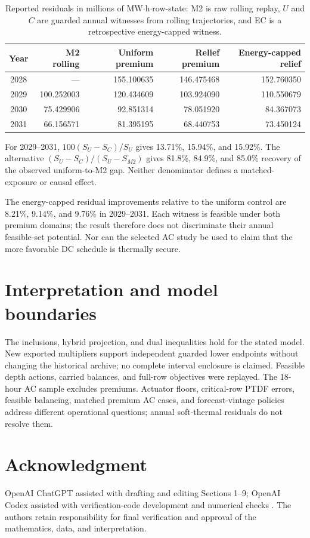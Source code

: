 \documentclass[11pt]{article}
\begin{document}
\begin{table}[ht]
\centering\small
\caption{Reported residuals in millions of MW$\cdot$h$\cdot$row-state: M2 is raw rolling replay, $U$ and $C$ are guarded annual witnesses from rolling trajectories, and EC is a retrospective energy-capped witness.}
\begin{tabular}{@{}crrrr@{}}\toprule
Year & M2 rolling & Uniform premium & Relief premium & Energy-capped relief\\\midrule
2028 & --- &155.100635&146.475468&152.760350\\
2029 &100.252003&120.434609&103.924090&110.550679\\
2030 &75.429906&92.851314&78.051920&84.367073\\
2031 &66.156571&81.395195&68.440753&73.450124\\\bottomrule
\end{tabular}
\end{table}
For 2029--2031, $100(S_U-S_C)/S_U$ gives 13.71\%, 15.94\%, and 15.92\%. The alternative $(S_U-S_C)/(S_U-S_{M2})$ gives 81.8\%, 84.9\%, and 85.0\% recovery of the observed uniform-to-M2 gap. Neither denominator defines a matched-exposure or causal effect.

The energy-capped residual improvements relative to the uniform control are 8.21\%, 9.14\%, and 9.76\% in 2029--2031. Each witness is feasible under both premium domains; the result therefore does not discriminate their annual feasible-set potential. Nor can the selected AC study be used to claim that the more favorable DC schedule is thermally secure.

\section{Interpretation and model boundaries}
The inclusions, hybrid projection, and dual inequalities hold for the stated model. New exported multipliers support independent guarded lower endpoints without changing the historical archive; no complete interval enclosure is claimed. Feasible depth actions, carried balances, and full-row objectives were replayed. The 18-hour AC sample excludes premiums. Actuator floors, critical-row PTDF errors, feasible balancing, matched premium AC cases, and forecast-vintage policies address different operational questions; annual soft-thermal residuals do not resolve them.

\section*{Acknowledgment}
OpenAI ChatGPT assisted with drafting and editing Sections 1--9; OpenAI Codex assisted with verification-code development and numerical checks \cite{OpenAI2026}. The authors retain responsibility for final verification and approval of the mathematics, data, and interpretation.


\end{document}
